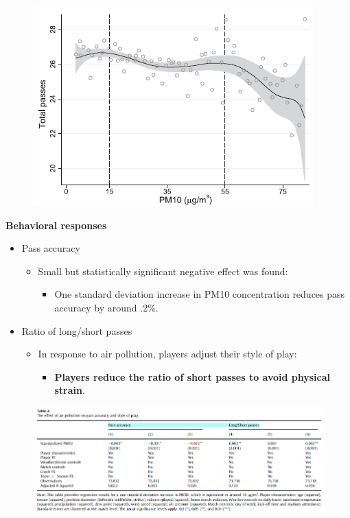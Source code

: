 \documentclass[../root]{subfiles}
\begin{document}
    \begin{figure}[H]
      \centering
      \includegraphics[scale = 1]{0522tanji/f4}
      \label{f4}
    \end{figure}

    \textbf{Behavioral responses}

    \begin{itemize}
      \item Pass accuracy
      \begin{itemize}
        \item Small but statistically significant negative effect was found:
        \begin{itemize}
          \item One standard deviation increase in PM10 concentration reduces pass accuracy by around .2\%.
        \end{itemize}
      \end{itemize}
      \item Ratio of long/short passes
      \begin{itemize}
        \item In response to air pollution, players adjust their style of play:
        \begin{itemize}
          \item \textbf{Players reduce the ratio of short passes to avoid physical strain}.
        \end{itemize}
      \end{itemize}
    \end{itemize}

    \begin{figure}[H]
      \centering
      \includegraphics[scale = 1]{0522tanji/t4}
      \label{t4}
    \end{figure}
\end{document}
